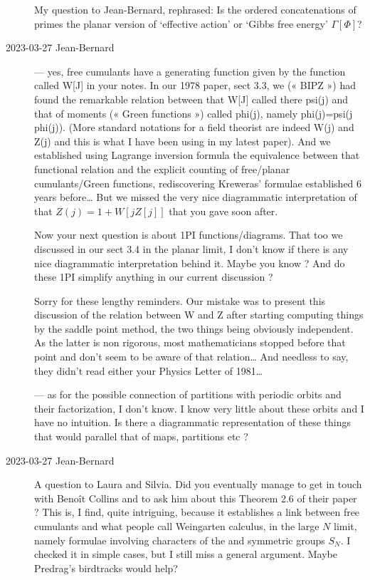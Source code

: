 \begin{description}
My question to Jean-Bernard, rephrased:
Is the ordered concatenations of primes the planar version of `effective
action' or `Gibbs free energy' $\Gamma[\Phi]$?

   \item[2023-03-27 Jean-Bernard]
— yes, free cumulants have a generating function given by the function
called W[J] in your notes. In our 1978 paper, sect 3.3, we («  BIPZ »)
had found the remarkable relation between that W[J] called there psi(j)
and that of moments («  Green functions »)  called phi(j), namely
phi(j)=psi(j phi(j)). (More standard notations for a field theorist are
indeed W(j) and Z(j) and this is what I have been using in my latest
paper). And we established using Lagrange inversion formula the
equivalence between  that functional relation and the explicit counting
of free/planar cumulants/Green functions, rediscovering Kreweras'
formulae established 6 years before… But we missed the very nice
diagrammatic interpretation of that $Z(j)=1+W[j Z[j]]$  that you gave
soon after.

Now your next question is about 1PI functions/diagrams. That too we
discussed in our sect 3.4 in the planar limit, I don't know if there is
any nice diagrammatic interpretation behind it. Maybe you know ? And do
these 1PI simplify anything in our current discussion ?

Sorry for these lengthy reminders. Our mistake was to present this
discussion of the relation between W and Z after starting computing
things by the saddle point method, the two things being obviously
independent. As the latter is non rigorous, most mathematicians stopped
before that point and don't seem to be aware of that relation… And
needless to say, they didn't read either your Physics Letter of 1981…

— as for the possible connection of partitions with periodic orbits and
their factorization, I don't know. I know very little about these orbits
and I have no intuition. Is there a diagrammatic representation of these
things that would parallel that of maps, partitions etc ?

   \item[2023-03-27 Jean-Bernard]
A question to Laura and Silvia. Did you eventually manage to get in touch
with Benoît Collins and to ask him about this Theorem 2.6 of their
paper ? This is, I find, quite intriguing,
because it establishes a link between free cumulants and what people call
Weingarten calculus, in the large $N$ limit, namely formulae involving
characters of the  and symmetric groups $S_N$. I checked it in
simple cases, but I still miss a general argument.
Maybe Predrag's birdtracks would help?


\end{description}
